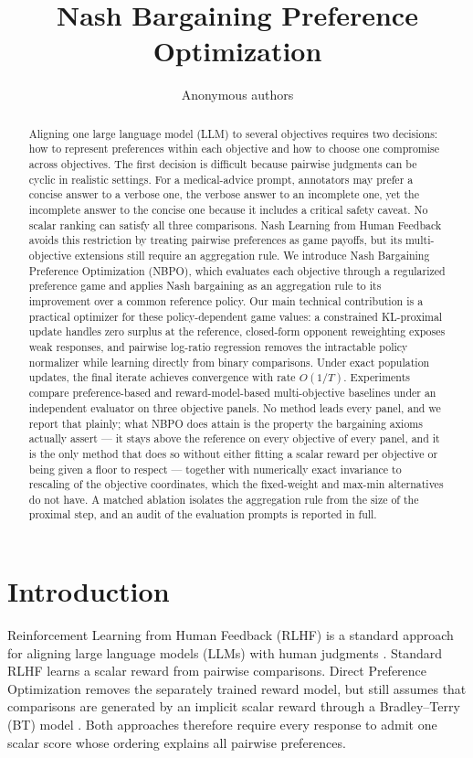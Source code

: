 \documentclass{article}
\title{Nash Bargaining Preference Optimization}
\author{Anonymous authors}
\theoremstyle{remark}
\theoremstyle{plain}
\newcommand{\NBPO}{\textsc{NBPO}}
\begin{document}
\maketitle

\begin{abstract}
Aligning one large language model (LLM) to several objectives requires two decisions: how to represent preferences within each objective and how to choose one compromise across objectives. The first decision is difficult because pairwise judgments can be cyclic in realistic settings. For a medical-advice prompt, annotators may prefer a concise answer to a verbose one, the verbose answer to an incomplete one, yet the incomplete answer to the concise one because it includes a critical safety caveat. No scalar ranking can satisfy all three comparisons. Nash Learning from Human Feedback avoids this restriction by treating pairwise preferences as game payoffs, but its multi-objective extensions still require an aggregation rule. We introduce Nash Bargaining Preference Optimization (\NBPO{}), which evaluates each objective through a regularized preference game and applies Nash bargaining as an aggregation rule to its improvement over a common reference policy. Our main technical contribution is a practical optimizer for these policy-dependent game values: a constrained KL-proximal update handles zero surplus at the reference, closed-form opponent reweighting exposes weak responses, and pairwise log-ratio regression removes the intractable policy normalizer while learning directly from binary comparisons. Under exact population updates, the final iterate achieves convergence with rate $O(1/T)$. Experiments compare preference-based and reward-model-based multi-objective baselines under an independent evaluator on three objective panels. No method leads every panel, and we report that plainly; what \NBPO{} does attain is the property the bargaining axioms actually assert --- it stays above the reference on every objective of every panel, and it is the only method that does so without either fitting a scalar reward per objective or being given a floor to respect --- together with numerically exact invariance to rescaling of the objective coordinates, which the fixed-weight and max-min alternatives do not have. A matched ablation isolates the aggregation rule from the size of the proximal step, and an audit of the evaluation prompts is reported in full.
\end{abstract}

\section{Introduction}
\label{sec:intro}
Reinforcement Learning from Human Feedback (RLHF) is a standard approach for aligning large language models (LLMs) with human judgments \citep{christiano2017deep,ouyang2022training}. Standard RLHF learns a scalar reward from pairwise comparisons. Direct Preference Optimization removes the separately trained reward model, but still assumes that comparisons are generated by an implicit scalar reward through a Bradley--Terry (BT) model \citep{rafailov2023direct,bradley1952rank}. Both approaches therefore require every response to admit one scalar score whose ordering explains all pairwise preferences.
\end{document}
